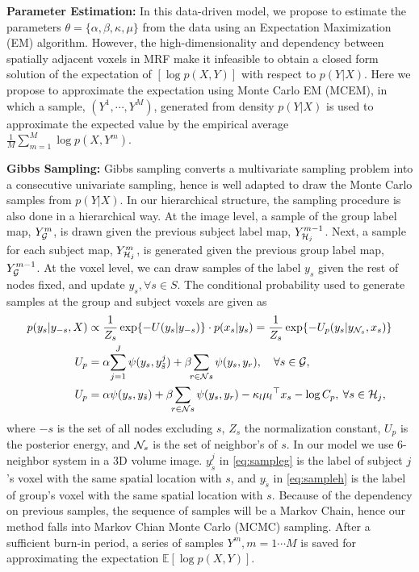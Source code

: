 \documentclass[runningheads,a4paper]{llncs}
\begin{document}
\noindent\textbf{Parameter Estimation: } In this data-driven model, we propose
to estimate the parameters $\theta = \{\alpha, \beta, \kappa, \mu\}$ from the
data using an Expectation Maximization (EM) algorithm. However, the
high-dimensionality and dependency between spatially adjacent voxels in MRF make
it infeasible to obtain a closed form solution of the expectation of $[\log
p(X,Y)]$ with respect to $p(Y|X)$. Here we propose to approximate the
expectation using Monte Carlo EM (MCEM), in which a sample, $(Y^1, \cdots,
Y^M)$, generated from density $p(Y|X)$ is used to approximate the expected value
by the empirical average $\frac{1}{M}\sum_{m=1}^M\log p (X, Y^m)$.

\noindent\textbf{Gibbs Sampling:} Gibbs sampling converts a multivariate
sampling problem into a consecutive univariate sampling, hence is well adapted
to draw the Monte Carlo samples from $p(Y|X)$.  In our hierarchical structure,
the sampling procedure is also done in a hierarchical way. At the image level, a
sample of the group label map, $Y^m_{\mathcal{G}}$, is drawn given the previous subject
label map, $Y^{m-1}_{\mathcal{H}_j}$. Next, a sample for each subject map,
$Y^m_{\mathcal{H}_j}$, is generated given the previous group label map, $Y^{m-1}_{\mathcal{G}}$.
At the voxel level, we can draw samples of the label $y_s$ given the rest of
nodes fixed, and update $y_s, \forall s \in S$. The conditional probability used
to generate samples at the group and subject voxels are given as
\vspace*{-8pt}
\begin{align}
p(y_s | y_{-s},X) &\propto \frac{1}{Z_s}\exp\{-U(y_s | y_{-s})\} \cdot p(x_s | y_s) = \frac{1}{Z_s}\exp\{-U_p(y_s | y_{\mathcal{N}_s }, x_s)\} \nonumber\\
U_p &= \alpha\!\sum_{j=1}^J \psi(y_s, y_{\tilde s}^j) + \beta\!\!\sum_{r\in \mathcal{N}{s}} \psi(y_s,y_r), \quad \forall s \in \mathcal{G}, \label{eq:sampleg}\\
U_p &= \alpha \psi(y_s,y_{\tilde s}) + \beta\!\!\sum_{r\in \mathcal{N}{s}} \psi (y_s, y_r) - \kappa_l \mu_l{}^\top x_s - \log C_p, \: \forall s \in \mathcal{H}_j, \label{eq:sampleh}
\end{align}
where $-s$ is the set of all nodes excluding $s$, $Z_s$ the normalization constant, $U_p$ is the posterior energy,
and $\mathcal{N}_s$ is the set of neighbor's of $s$. In our model we use 6-neighbor
system in a 3D volume image.  $y_{\tilde s}^j$ in \eqref{eq:sampleg} is the
label of subject $j$'s voxel with the same spatial location with $s$, and
$y_{\tilde s}$ in \eqref{eq:sampleh} is the label of group's voxel with the same
spatial location with $s$. Because of the dependency on previous samples, the
sequence of samples will be a Markov Chain, hence our method falls into Markov
Chian Monte Carlo (MCMC) sampling.  After a sufficient burn-in period, a series
of samples $Y^m, m = 1\cdots M$ is saved for approximating the expectation
$\mathbb{E}[\log p(X,Y)]$.
\end{document}
